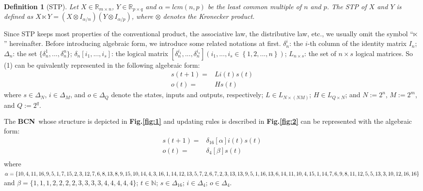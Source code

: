 \documentclass[letterpaper, 10 pt, conference]{ieeeconf}  %
\newtheorem{definition}{Definition}
\def \BCN {{\bf BCN}}
\begin{document}
\begin{definition}[STP] 
	Let $X\in\mathbb{R}_{m\times n}$, $Y\in\mathbb{R}_{p\times q}$ and $\alpha=lcm(n,p)$ be the least common multiple of $n$ and $p$. The STP of $X$ and $Y$ is defined as $X\ltimes Y=(X\otimes I_{\alpha/n})(Y\otimes I_{\alpha/p})$, where $\otimes$ denotes the Kronecker product. 
\end{definition}

Since STP keeps most properties of the conventional product, the associative law, the distributive law, etc., we usually omit the symbol ``$\ltimes$'' hereinafter. Before introducing algebraic form, we introduce some related notations at first. $\delta^i_n$: the $i$-th column of the identity matrix $I_n$; $\Delta_n$: the set $\{\delta^1_n,...,\delta^n_n \}$; $\delta_n \left[i_1,...,i_s\right]$: the logical matrix $\left[\delta^{i_1}_n,...,\delta^{i_s}_n\right]\left(i_1,...,i_s\in\left\{1,2,...,n\right\}\right)$; $L_{n\times s}$: the set of $n\times s$ logical matrices. So (1) can be quivalently represented in the following algebraic form:
\begin{equation}
\begin{split}
s(t+1)=&Li(t)s(t)\\
o(t)=&Hs(t)
\end{split}
\end{equation}
where $s\in\Delta_N$, $i\in\Delta_M$, and  $o\in\Delta_Q$ denote the states, inputs and outputs, respectively; $L\in L_{N\times\left(NM\right)}$; $H\in L_{Q\times N}$; and $N:=2^n$, $M:=2^m$, and $Q:=2^q$.



The \BCN\ whose structure is depicted in {\bf Fig.\ref{fig:1}} and updating rules is described in {\bf Fig.\ref{fig:2}} can be represented with the algebraic form:
\begin{equation}
\begin{split}
s(t+1) =&\delta_{16}[\alpha]i(t)s(t)\\
o(t) =&\delta_4[\beta]s(t)\\
\end{split}
\end{equation}
where $\alpha=\{10,4,11,16,9,5,1, 7,15,2,3,12,7,6,8,13,8,9,\\15,10,14,4,3,16,1,14,12,13,5,7,2,6,7,2,3,13,13,9,5,1,\\16,13 ,6,14,11,10,4,15,1,14 ,7,6,9 ,8,11,12,5,5,13,3,10,\\12,16,16\}$ and $\beta=\{1,1,1,2,2,2,2,3,3,3,3,4,4,4,4,4\}$; $t\in \mathbb{N}$; $s\in \Delta_{16}$; $i\in \Delta_4$; $o\in \Delta_4$.
\end{document}
